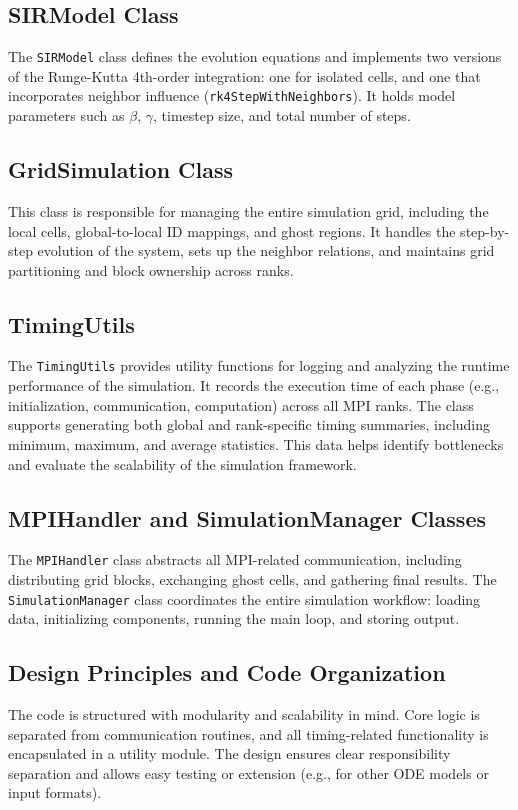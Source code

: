 \subsection{SIRModel Class}
The \texttt{SIRModel} class defines the evolution equations and implements two versions of the Runge-Kutta 4th-order integration: one for isolated cells, and one that incorporates neighbor influence (\texttt{rk4StepWithNeighbors}). It holds model parameters such as \( \beta \), \( \gamma \), timestep size, and total number of steps.

\subsection{GridSimulation Class}
This class is responsible for managing the entire simulation grid, including the local cells, global-to-local ID mappings, and ghost regions. It handles the step-by-step evolution of the system, sets up the neighbor relations, and maintains grid partitioning and block ownership across ranks.

\subsection{TimingUtils}
The \texttt{TimingUtils} provides utility functions for logging and analyzing the runtime performance of the simulation. It records the execution time of each phase (e.g., initialization, communication, computation) across all MPI ranks. The class supports generating both global and rank-specific timing summaries, including minimum, maximum, and average statistics. This data helps identify bottlenecks and evaluate the scalability of the simulation framework.

\subsection{MPIHandler and SimulationManager Classes}
The \texttt{MPIHandler} class abstracts all MPI-related communication, including distributing grid blocks, exchanging ghost cells, and gathering final results. The \texttt{SimulationManager} class coordinates the entire simulation workflow: loading data, initializing components, running the main loop, and storing output.

\subsection{Design Principles and Code Organization}
The code is structured with modularity and scalability in mind. Core logic is separated from communication routines, and all timing-related functionality is encapsulated in a utility module. The design ensures clear responsibility separation and allows easy testing or extension (e.g., for other ODE models or input formats).
